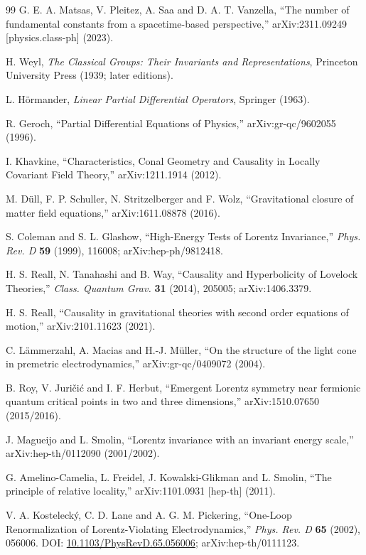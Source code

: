 \documentclass[11pt,a4paper]{article}
\begin{document}
\begin{thebibliography}{99}
G. E. A. Matsas, V. Pleitez, A. Saa and D. A. T. Vanzella, ``The number of fundamental constants from a spacetime-based perspective,'' arXiv:2311.09249 [physics.class-ph] (2023).



H. Weyl, \emph{The Classical Groups: Their Invariants and Representations}, Princeton University Press (1939; later editions).

L. H\"{o}rmander, \emph{Linear Partial Differential Operators}, Springer (1963).

R. Geroch, ``Partial Differential Equations of Physics,'' arXiv:gr-qc/9602055 (1996).

I. Khavkine, ``Characteristics, Conal Geometry and Causality in Locally Covariant Field Theory,'' arXiv:1211.1914 (2012).

M. D\"{u}ll, F. P. Schuller, N. Stritzelberger and F. Wolz, ``Gravitational closure of matter field equations,'' arXiv:1611.08878 (2016).

S. Coleman and S. L. Glashow, ``High-Energy Tests of Lorentz Invariance,'' \emph{Phys. Rev. D} \textbf{59} (1999), 116008; arXiv:hep-ph/9812418.

H. S. Reall, N. Tanahashi and B. Way, ``Causality and Hyperbolicity of Lovelock Theories,'' \emph{Class. Quantum Grav.} \textbf{31} (2014), 205005; arXiv:1406.3379.

H. S. Reall, ``Causality in gravitational theories with second order equations of motion,'' arXiv:2101.11623 (2021).

C. L\"{a}mmerzahl, A. Macias and H.-J. M\"{u}ller, ``On the structure of the light cone in premetric electrodynamics,'' arXiv:gr-qc/0409072 (2004).

B. Roy, V. Juri\v{c}i\'c and I. F. Herbut, ``Emergent Lorentz symmetry near fermionic quantum critical points in two and three dimensions,'' arXiv:1510.07650 (2015/2016).

J. Magueijo and L. Smolin, ``Lorentz invariance with an invariant energy scale,'' arXiv:hep-th/0112090 (2001/2002).

G. Amelino-Camelia, L. Freidel, J. Kowalski-Glikman and L. Smolin, ``The principle of relative locality,'' arXiv:1101.0931 [hep-th] (2011).

V. A. Kosteleck\'y, C. D. Lane and A. G. M. Pickering, ``One-Loop Renormalization of Lorentz-Violating Electrodynamics,'' \emph{Phys. Rev. D} \textbf{65} (2002), 056006. DOI: \href{https://doi.org/10.1103/PhysRevD.65.056006}{10.1103/PhysRevD.65.056006}; arXiv:hep-th/0111123.


\end{thebibliography}
\end{document}

